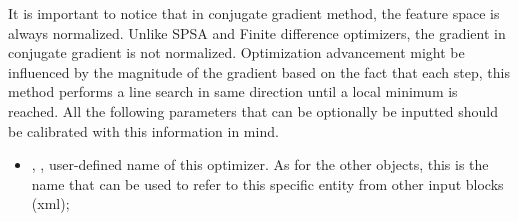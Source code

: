 It is important to notice that in conjugate gradient method, the feature space is always normalized. Unlike SPSA and Finite difference
optimizers, the gradient in conjugate gradient is not normalized. Optimization advancement might be influenced by the
magnitude of the gradient based on the fact that each step, this method performs a line search in same direction until a local minimum
is reached. All the following parameters that can be optionally be inputted should be calibrated with this information in mind.

%

%
\attrsIntro
\vspace{-5mm}
\begin{itemize}
\itemsep0em
\item {}, , user-defined name of this optimizer. \nb As for the other objects, this is
the name that can be used to refer to this specific entity from other input blocks (xml);
\end{itemize}
\vspace{-5mm}

